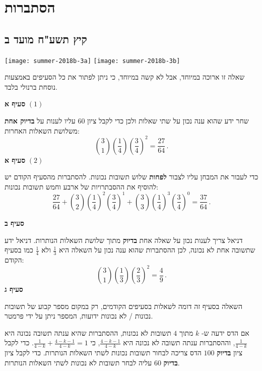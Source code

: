 

\chapter{הסתברות}


\section{קיץ תשע"ח מועד ב}

\begin{center}
\hspace*{8em}\texttt{[image: summer-2018b-3a]}
\hspace*{-2.2em}\texttt{[image: summer-2018b-3b]}
\end{center}

שאלה זו ארוכה במיוחד, אבל לא קשה במיוחד, כי ניתן לפתור את כל הסעיפים באמצעות נוסחת ברנולי בלבד.

\textbf{סעיף א}
$(1)$

שחר ידע שהוא ענה נכון על שתי שאלות ולכן כדי לקבל ציון
$60$
עליו לענות על 
\textbf{בדיוק אחת}
משלושת השאלות האחרות:
\[
{3 \choose 1}\left(\frac{1}{4}\right)\left(\frac{3}{4}\right)^2=\frac{27}{64}\,.
\]
\textbf{סעיף א}
$(2)$

כדי לעבור את המבחן עליו לצבור
\textbf{לפחות}
שלוש תשובות נכונות. להסתברות מהסעיף הקודם יש להוסיף את ההסבתרויות של ארבע וחמש תשובות נכונות:
\[
\frac{27}{64}+{3 \choose 2}\left(\frac{1}{4}\right)^2\left(\frac{3}{4}\right)^1+{3 \choose 3}\left(\frac{1}{4}\right)^3\left(\frac{3}{4}\right)^0=\frac{37}{64}\,.
\]

\np

\textbf{סעיף ב}

דניאל צריך לענות נכון על שאלה אחת 
\textbf{בדיוק}
מתוך שלושת השאלות הנותרות. דניאל ידע שתשובה אחת לא נכונה, לכן ההסתברות שהוא ענה נכון על השאלה היא
$\displaystyle\frac{1}{3}$
ולא 
$\displaystyle\frac{1}{4}$
כמו בסעיף הקודם:
\[
{3 \choose 1}\left(\frac{1}{3}\right)\left(\frac{2}{3}\right)^2=\frac{4}{9}\,.
\]
\textbf{סעיף ג}

השאלה בסעיף זה דומה לשאלות בסעיפים הקודמים, רק במקום מספר קבוע של תשובות נכונות / לא נכונות ידועות, המספר ניתן על ידי פרמטר.

אם הדס ידעה ש-%
$k$
מתוך 
$4$
תשובות לא נכונות, ההסתברות שהיא ענתה תשובה נכונה היא
$\displaystyle\frac{1}{4-k}$,
וההסתברות ענתה תשובה לא נכונה היא
$\displaystyle\frac{4-k-1}{4-k}$,
כי 
$\displaystyle\frac{1}{4-k}+\frac{4-k-1}{4-k}=1$.
כדי לקבל ציון 
\textbf{בדיוק}
$100$
הדס צריכה לבחור תשובות נכונות לשתי השאלות הנותרות. כדי לקבל ציון 
\textbf{בדיוק}
$60$
עליה לבחר תשובות לא נכונות לשתי השאלות הנותרות.

